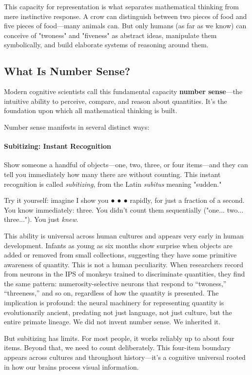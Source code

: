 This capacity for representation is what separates mathematical thinking from mere instinctive response. A crow can distinguish between two pieces of food and five pieces of food—many animals can. But only humans (as far as we know) can conceive of "twoness" and "fiveness" as abstract ideas, manipulate them symbolically, and build elaborate systems of reasoning around them.

\subsection{What Is Number Sense?}

Modern cognitive scientists call this fundamental capacity \textbf{number sense}—the intuitive ability to perceive, compare, and reason about quantities. It's the foundation upon which all mathematical thinking is built.

Number sense manifests in several distinct ways:

\paragraph{Subitizing: Instant Recognition}
Show someone a handful of objects—one, two, three, or four items—and they can tell you immediately how many there are without counting. This instant recognition is called \textit{subitizing}, from the Latin \textit{subitus} meaning "sudden."

Try it yourself: imagine I show you ● ● ● rapidly, for just a fraction of a second. You know immediately: three. You didn't count them sequentially ("one... two... three..."). You just \textit{knew}.

This ability is universal across human cultures and appears very early in human development. Infants as young as six months show surprise when objects are added or removed from small collections, suggesting they have some primitive awareness of quantity. This is not a human peculiarity. When researchers record from neurons in the IPS of monkeys trained to discriminate quantities, they find the same pattern: numerosity-selective neurons that respond to ``twoness,'' ``threeness,'' and so on, regardless of how the quantity is presented. The implication is profound: the neural machinery for representing quantity is evolutionarily ancient, predating not just language, not just culture, but the entire primate lineage. We did not invent number sense. We inherited it.

But subitizing has limits. For most people, it works reliably up to about four items. Beyond that, we need to count deliberately. This four-item boundary appears across cultures and throughout history—it's a cognitive universal rooted in how our brains process visual information.

